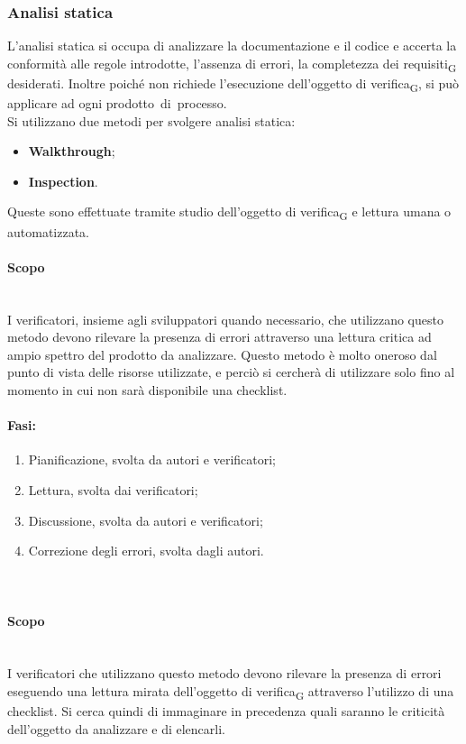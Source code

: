 \subsubsection{Analisi statica}
L’analisi statica si occupa di analizzare la documentazione e il codice e accerta la conformità alle regole introdotte, l'assenza di errori, la completezza dei requisiti\textsubscript{G} desiderati. Inoltre poiché non richiede l’esecuzione dell’oggetto di verifica\textsubscript{G}, si può applicare ad ogni prodotto di processo.\\
Si utilizzano due metodi per svolgere analisi statica:
\begin{itemize}
	\item \textbf{Walkthrough};
	\item \textbf{Inspection}.
\end{itemize}
Queste sono effettuate tramite studio dell’oggetto di verifica\textsubscript{G} e lettura umana o automatizzata.
\paragraph {Scopo}\mbox{}\\
I verificatori, insieme agli sviluppatori quando necessario, che utilizzano questo metodo devono rilevare la presenza di errori attraverso una lettura critica ad ampio spettro del prodotto da analizzare. Questo metodo è molto oneroso dal punto di vista delle risorse utilizzate, e perciò si cercherà di utilizzare solo fino al momento in cui non sarà disponibile una checklist.
\paragraph {Fasi:}\:
\begin{enumerate}
	\item Pianificazione, svolta da autori e verificatori;
	\item Lettura, svolta dai verificatori;
	\item Discussione, svolta da autori e verificatori;
	\item Correzione degli errori, svolta dagli autori.
\end{enumerate}
\paragraph {}\mbox{}\\
\paragraph {Scopo}\mbox{}\\
I verificatori che utilizzano questo metodo devono rilevare la presenza di errori eseguendo una lettura mirata dell’oggetto di verifica\textsubscript{G} attraverso l'utilizzo di una checklist. Si cerca quindi di immaginare in precedenza quali saranno le criticità dell'oggetto da analizzare e di elencarli.
